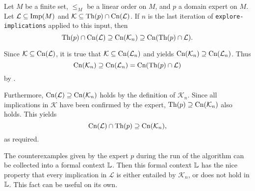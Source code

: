 \begin{Theorem}
  \label{thm:explore-implications-correctness}
  Let $M$ be a finite set, $\leq_{M}$ be a linear order on $M$, and $p$ a domain expert on
  $M$. Let $\mathcal{L} \subseteq \operatorname{Imp}(M)$ and $\mathcal{K} \subseteq \operatorname{Th}(p) \cap
  \operatorname{Cn}(\mathcal{L})$.  If $n$ is the last iteration of \lstinline{explore-implications}
  applied to this input, then
  \begin{equation*}
    \operatorname{Th}(p) \cap \operatorname{Cn}(\mathcal{L}) \supseteq \operatorname{Cn}(\mathcal{K}_{n}) \supseteq \operatorname{Cn}(\operatorname{Th}(p) \cap \mathcal{L}).
  \end{equation*}
\end{Theorem}
\begin{Proof}
  Since $\mathcal{K} \subseteq \operatorname{Cn}(\mathcal{L})$, it is true that $\mathcal{K} \subseteq
  \operatorname{Cn}(\mathcal{L}_{n})$ and  yields
  $\operatorname{Cn}(\mathcal{K}_{n}) \supseteq \operatorname{Cn}(\mathcal{L}_{n})$.  Thus
  \begin{equation*}
    \operatorname{Cn}(\mathcal{K}_{n}) \supseteq \operatorname{Cn}(\mathcal{L}_{n}) = \operatorname{Cn}(\operatorname{Th}(p) \cap \mathcal{L})
  \end{equation*}
  by .

  Furthermore, $\operatorname{Cn}(\mathcal{L}) \supseteq \operatorname{Cn}(\mathcal{K}_{n})$ holds by the definition
  of $\mathcal{K}_{n}$.  Since all implications in $\mathcal{K}$ have been confirmed by
  the expert, $\operatorname{Th}(p) \supseteq \operatorname{Cn}(\mathcal{K}_{n})$ also holds.  This yields
  \begin{equation*}
    \operatorname{Cn}(\mathcal{L}) \cap \operatorname{Th}(p) \supseteq \operatorname{Cn}(\mathcal{K}_{n}),
  \end{equation*}
  as required.
\end{Proof}

The counterexamples given by the expert $p$ during the run of the algorithm can be
collected into a formal context ${\mathbb{L}}$.  Then this formal context ${\mathbb{L}}$ has the nice
property that every implication in $\mathcal{L}$ is either entailed by $\mathcal{K}_{n}$,
or does not hold in ${\mathbb{L}}$.  This fact can be useful on its own.

